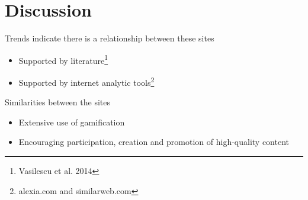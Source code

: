 \documentclass{beamer}
\begin{document}


\section{Discussion}

\begin{frame}
  Trends indicate there is a relationship between these sites
  \begin{itemize}
  \item Supported by literature\footnote{Vasilescu et al. 2014}
  \item Supported by internet analytic tools\footnote{alexia.com and similarweb.com}
  \end{itemize}
  Similarities between the sites
  \begin{itemize}
  \item Extensive use of gamification
  \item Encouraging participation, creation and promotion of high-quality content
  \end{itemize}
\end{frame}





\end{document}
